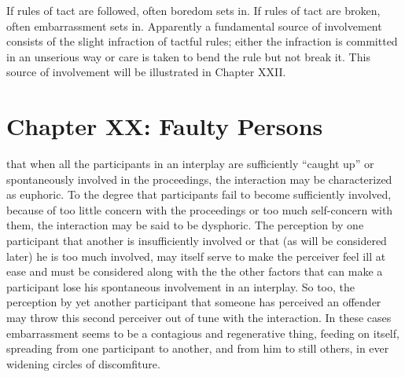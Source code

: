 \documentclass[openany,nobib]{tufte-book}
\let\oldchapter\chapter
\def\chapter{%
  \setcounter{footnote}{0}%
  \oldchapter
}
\begin{document}
If rules of tact are followed, often boredom sets in. If rules of tact
are broken, often embarrassment sets in. Apparently a fundamental source
of involvement consists of the slight infraction of tactful rules;
either the infraction is committed in an unserious way or care is taken
to bend the rule but not break it. This source of involvement will be
illustrated in Chapter XXII.

\chapter[CHAPTER XX: FAULTY PERSONS]{Chapter XX: Faulty Persons}
\label{ch:Chapter XX: Faulty Persons}

that when all the participants in an interplay are
sufficiently ``caught up'' or spontaneously involved in the proceedings,
the interaction may be characterized as euphoric. To the degree that
participants fail to become sufficiently involved, because of too little
concern with the proceedings or too much self-concern with them, the
interaction may be said to be dysphoric. The perception by one
participant that another is insufficiently involved or that (as will be
considered later) he is too much involved, may itself serve to make the
perceiver feel ill at ease and must be considered along with the the
other factors that can make a participant lose his spontaneous
involvement in an interplay. So too, the perception by yet another
participant that someone has perceived an offender may throw this second
perceiver out of tune with the interaction. In these cases embarrassment
seems to be a contagious and regenerative thing, feeding on itself,
spreading from one participant to another, and from him to still others,
in ever widening circles of discomfiture.
\end{document}
